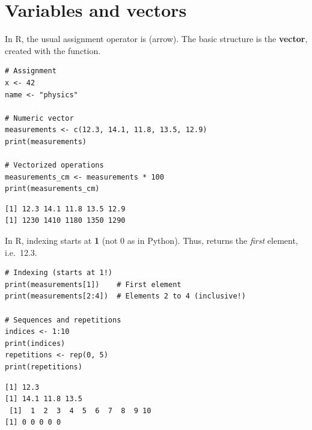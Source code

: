 \section{Variables and vectors}

In R, the usual assignment operator is \ri{<-} (arrow). The basic structure
is the \textbf{vector}, created with the  function.

\begin{codeblock}[title=\textbf{R}]
\begin{verbatim}
# Assignment
x <- 42
name <- "physics"

# Numeric vector
measurements <- c(12.3, 14.1, 11.8, 13.5, 12.9)
print(measurements)

# Vectorized operations
measurements_cm <- measurements * 100
print(measurements_cm)
\end{verbatim}
\end{codeblock}

\begin{codeoutput}
\begin{verbatim}
[1] 12.3 14.1 11.8 13.5 12.9
[1] 1230 1410 1180 1350 1290
\end{verbatim}
\end{codeoutput}

\begin{warning}
In R, indexing starts at \textbf{1} (not 0 as in Python).
Thus,  returns the \emph{first} element, i.e.\ 12.3.
\end{warning}

\begin{codeblock}[title=\textbf{R}]
\begin{verbatim}
# Indexing (starts at 1!)
print(measurements[1])    # First element
print(measurements[2:4])  # Elements 2 to 4 (inclusive!)

# Sequences and repetitions
indices <- 1:10
print(indices)
repetitions <- rep(0, 5)
print(repetitions)
\end{verbatim}
\end{codeblock}

\begin{codeoutput}
\begin{verbatim}
[1] 12.3
[1] 14.1 11.8 13.5
 [1]  1  2  3  4  5  6  7  8  9 10
[1] 0 0 0 0 0
\end{verbatim}
\end{codeoutput}

